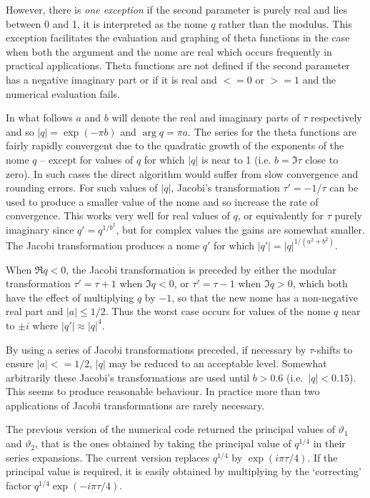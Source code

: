 However, there is \emph{one exception} if the second parameter is purely real
and lies between 0 and 1, it is interpreted as the nome $q$ rather than the
modulus. This exception facilitates the evaluation and graphing of theta
functions in the case when both the argument and the nome are real which occurs
frequently in practical applications.  Theta functions are not defined if the
second parameter has a negative imaginary part or if it is real and
$<= 0$ or $>=1$ and the numerical evaluation fails.


In what follows $a$ and $b$ will denote the real and imaginary parts of
$\tau$ respectively and so $|q| = \exp(-\pi b)$ and $\arg q =\pi a$.
The series for the theta functions are fairly rapidly convergent
due to the quadratic growth of the exponents of the nome $q$ -- except
for values of $q$ for which $|q|$ is near to 1
(i.e. $b=\Im \tau $ close to zero).
In such cases the direct algorithm would suffer from slow convergence and
rounding errors.
For such values of $|q|$, Jacobi's transformation $\tau'=-1/\tau$ can be
used to produce a smaller value of the nome and so increase the rate of
convergence.
This works very well for real values of $q$, or equivalently for $\tau$ purely
imaginary since $q'= q^{1/b^2}$, but for complex
values the gains are somewhat smaller. The Jacobi transformation produces a
nome $q'$ for which $|q'| =  |q|^{1/(a^2+b^2)}$.

When $\Re q < 0$, the Jacobi transformation is preceded by either the
modular transformation $\tau' = \tau+1$ when $\Im q < 0$, or $\tau' = \tau-1$
when $\Im q > 0$, which both have the effect  of multiplying $q$ by $-1$,
so that the new nome has a non-negative real part and $|a| \leq 1/2$.
Thus the worst case occurs for values of the nome $q$ near to $\pm i$ where
$|q'| \approx |q|^4$.

By using a series of Jacobi transformations preceded, if necessary by
$\tau$-shifts to ensure $|a| <= 1/2$, $|q|$ may be reduced to an acceptable
level. Somewhat arbitrarily these Jacobi's transformations are used
until $b > 0.6$ (i.e.~$|q| < 0.15$). This seems to produce reasonable
behaviour. In practice more than two applications of Jacobi transformations
are rarely necessary.

The previous version of the numerical code returned the principal values
of $\vartheta_1$ and $\vartheta_2$, that is the ones obtained by taking
the principal value of $q^{1/4}$ in their series expansions. The current version replaces
$q^{1/4}$ by $\exp(i\pi\tau/4)$.  If the principal value is required, it is easily obtained
by multiplying by the `correcting' factor $q^{1/4}\exp(-i\pi\tau/4)$.


